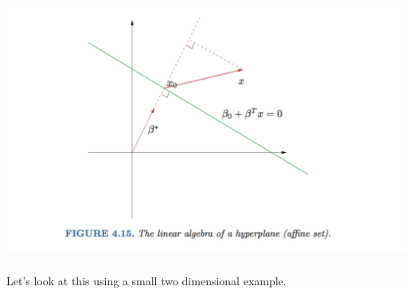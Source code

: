 \documentclass[xetex,mathserif,serif,aspectratio=169]{beamer}
\begin{document}
\begin{frame}[fragile] \frametitle{} \oldB \small

\begin{center}
\includegraphics[height=0.7\textheight]{img/hyperplane.pdf}
\end{center}

\end{frame}

\begin{frame}[fragile] \frametitle{} \oldB \small

\textbf{}

Let's look at this using a small two dimensional example.

\end{frame}

{
\begin{frame}[plain]
\end{frame}
}
\end{document}
